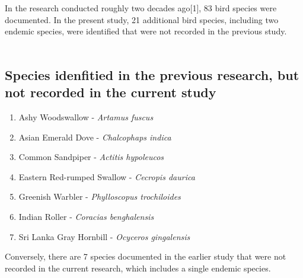 In the research conducted roughly two decades ago[1], 83 bird species were documented. In the present study, 21 additional bird species, including two endemic species, were identified that were not recorded in the previous study.
\\\\

\begin{importantbox}
\subsection{Species idenfitied in the previous research, but not recorded in the current study}
\begin{enumerate}
    \item Ashy Woodswallow - \textit{Artamus fuscus}
    \item Asian Emerald Dove - \textit{Chalcophaps indica}
    \item Common Sandpiper - \textit{Actitis hypoleucos}
    \item Eastern Red-rumped Swallow - \textit{Cecropis daurica}
    \item Greenish Warbler - \textit{Phylloscopus trochiloides}
    \item Indian Roller - \textit{Coracias benghalensis}
    \item Sri Lanka Gray Hornbill - \textit{Ocyceros gingalensis}

\end{enumerate}
\end{importantbox}

Conversely, there are 7 species documented in the earlier study that were not recorded in the current research, which includes a single endemic species.